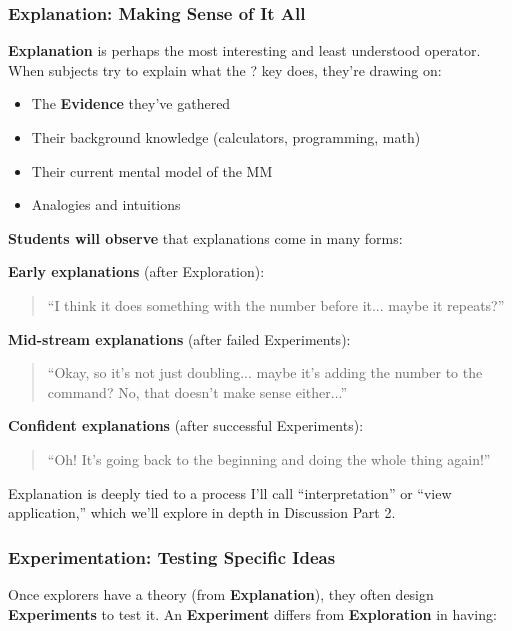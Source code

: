 \documentclass[12pt,letterpaper]{article}
\begin{document}
\subsubsection{Explanation: Making Sense of It All}

\textbf{Explanation} is perhaps the most interesting and least understood operator. When subjects try to explain what the ? key does, they're drawing on:

\begin{itemize}
\item The \textbf{Evidence} they've gathered
\item Their background knowledge (calculators, programming, math)
\item Their current mental model of the MM
\item Analogies and intuitions
\end{itemize}

\textbf{Students will observe} that explanations come in many forms:

\textbf{Early explanations} (after Exploration):
\begin{quote}
``I think it does something with the number before it... maybe it repeats?''
\end{quote}

\textbf{Mid-stream explanations} (after failed Experiments):
\begin{quote}
``Okay, so it's not just doubling... maybe it's adding the number to the command? No, that doesn't make sense either...''
\end{quote}

\textbf{Confident explanations} (after successful Experiments):
\begin{quote}
``Oh! It's going back to the beginning and doing the whole thing again!''
\end{quote}

Explanation is deeply tied to a process I'll call ``interpretation'' or ``view application,'' which we'll explore in depth in Discussion Part 2.

\subsubsection{Experimentation: Testing Specific Ideas}

Once explorers have a theory (from \textbf{Explanation}), they often design \textbf{Experiments} to test it. An \textbf{Experiment} differs from \textbf{Exploration} in having:
\end{document}
